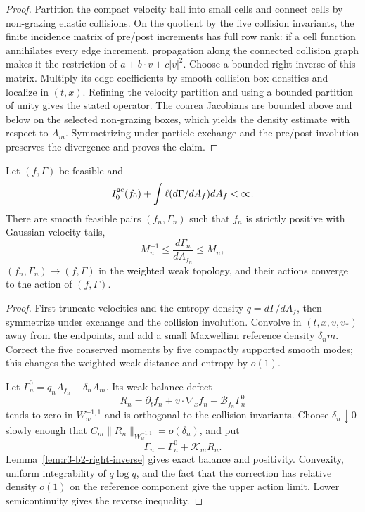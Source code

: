 \begin{proof}
Partition the compact velocity ball into small cells and connect cells by
non-grazing elastic collisions.  On the quotient by the five collision
invariants, the finite incidence matrix of pre/post increments has full row
rank: if a cell function annihilates every edge increment, propagation along
the connected collision graph makes it the restriction of
\(a+b\cdot v+c|v|^2\).  Choose a bounded right inverse of this matrix.
Multiply its edge coefficients by smooth collision-box densities and localize
in \((t,x)\).  Refining the velocity partition and using a bounded partition
of unity gives the stated operator.  The coarea Jacobians are bounded above
and below on the selected non-grazing boxes, which yields the density estimate
with respect to \(A_m\).  Symmetrizing under particle exchange and the
pre/post involution preserves the divergence and proves the claim.
\end{proof}

\begin{lemma}
\label{lem:r3-b2-regularization}
Let \((f,\Gamma)\) be feasible and
\[
 I_0^{\rm gc}(f_0)+
 \int\ell(d\Gamma/dA_f)dA_f<\infty.
\]
There are smooth feasible pairs \((f_n,\Gamma_n)\) such that
\(f_n\) is strictly positive with Gaussian velocity tails,
\[
 M_n^{-1}\le\frac{d\Gamma_n}{dA_{f_n}}\le M_n,
\]
\((f_n,\Gamma_n)\to(f,\Gamma)\) in the weighted weak topology, and their
actions converge to the action of \((f,\Gamma)\).
\end{lemma}

\begin{proof}
First truncate velocities and the entropy density
\(q=d\Gamma/dA_f\), then symmetrize under exchange and the collision
involution.  Convolve in \((t,x,v,v_*)\) away from the endpoints, and add a
small Maxwellian reference density \(\delta_nm\).  Correct the five conserved
moments by five compactly supported smooth modes; this changes the weighted
weak distance and entropy by \(o(1)\).

Let \(\Gamma_n^0=q_nA_{f_n}+\delta_nA_m\).  Its weak-balance defect
\[
 R_n=\partial_tf_n+v\cdot\nabla_xf_n-\mathscr B_{f_n}\Gamma_n^0
\]
tends to zero in \(W^{-1,1}_w\) and is orthogonal to the collision invariants.
Choose \(\delta_n\downarrow0\) slowly enough that
\(C_m\|R_n\|_{W^{-1,1}_w}=o(\delta_n)\), and put
\[
 \Gamma_n=\Gamma_n^0+\mathscr K_mR_n.
\]
Lemma~\ref{lem:r3-b2-right-inverse} gives exact balance and positivity.
Convexity, uniform integrability of \(q\log q\), and the fact that the
correction has relative density \(o(1)\) on the reference component give the
upper action limit.  Lower semicontinuity gives the reverse inequality.
\end{proof}

